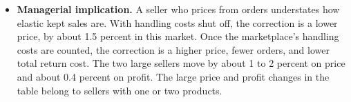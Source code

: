 \documentclass[11pt]{article}
\begin{document}
\begin{itemize}
    \item \textbf{Managerial implication.}
    A seller who prices from orders understates how elastic kept sales are. With handling costs shut off, the correction is a lower price, by about 1.5 percent in this market. Once the marketplace's handling costs are counted, the correction is a higher price, fewer orders, and lower total return cost. The two large sellers move by about 1 to 2 percent on price and about 0.4 percent on profit. The large price and profit changes in the table belong to sellers with one or two products.
\end{itemize}



\end{document}
